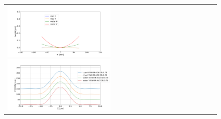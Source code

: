 \documentclass[aps,pra,showpacs,twocolumn,amsmath,amssymb,superscriptaddress,nofootinbib]{revtex4}
\begin{document}
\begin{figure}
\begin{center}
\begin{tabular}{l}
   \includegraphics[width=0.5\textwidth]{figures/correctionprofilescropped.png}
   \includegraphics[width=0.5\textwidth]{figures/intensitycorrectedcropped.png}\\
   \end{tabular}
   \end{center}

   \end{figure} 
\end{document}
